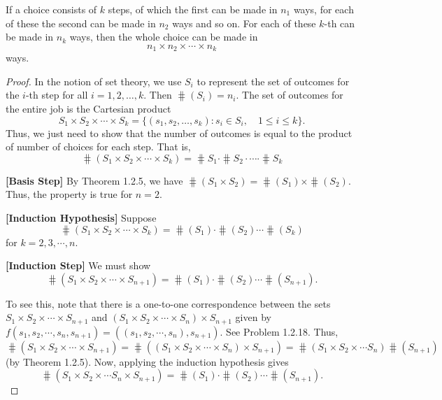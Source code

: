 \begin{theorem}
    If a choice consists of $k$ steps, of which the first can be made in $n_1$ ways, for each of these the second can be made in $n_2$ 
    ways and so on. For each of these $k$-th can be made in $n_k$ ways, then the whole choice can be made in 
    \[
        n_1 \times n_2 \times \cdots \times n_k
    \]
    ways.
\end{theorem}
\begin{proof}
    In the notion of set theory, we use $S_i$ to represent the set of outcomes for the $i$-th step for all $i = 1, 2, \ldots, k$. 
    Then $\hash (S_i) = n_i$. The set of outcomes for the entire job is the Cartesian product 
    \begin{equation}
        S_1 \times S_2 \times \cdots \times S_k = \{ (s_1, s_2, \ldots, s_k) : s_i \in S_i, \quad 1 \leq i \leq k \}.
    \end{equation}
    Thus, we just need to show that the number of outcomes is equal to the product of number of choices for each step. That is,
    \begin{equation}
        \hash (S_1 \times S_2 \times \cdots \times S_k) = \hash S_1 \cdot \hash S_2 \cdot \cdots \cdot \hash S_k
    \end{equation}

    \textbf{[Basis Step]} By Theorem 1.2.5, we have $\hash(S_1 \times S_2) = \hash(S_1) \times \hash(S_2)$. Thus, the property
    is true for $n = 2$.

    \vspace*{0.5em}
    \textbf{[Induction Hypothesis]}
    Suppose
    \[
        \hash(S_1 \times S_2 \times \cdots \times S_k) = \hash(S_1) \cdot \hash(S_2) \cdots \hash(S_k)
    \]
    for $k = 2, 3, \cdots, n$.

    \vspace*{0.5em}
    \textbf{[Induction Step]}
    We must show
    \[
        \hash(S_1 \times S_2 \times \cdots \times S_{n+1}) = \hash(S_1) \cdot \hash(S_2) \cdots \hash(S_{n+1}).
    \]

    To see this, note that there is a one-to-one correspondence between the sets
    $S_1 \times S_2 \times \cdots \times S_{n+1}$ and $(S_1 \times S_2 \times \cdots \times S_n) \times S_{n+1}$ given by $f(s_1, s_2, \cdots, s_n, s_{n+1}) =
    ((s_1, s_2, \cdots, s_n), s_{n+1})$. See Problem 1.2.18. Thus, \[\hash(S_1 \times S_2 \times \cdots \times S_{n+1}) =
    \hash((S_1 \times S_2 \times \cdots \times S_n) \times S_{n+1}) = \hash(S_1 \times S_2 \times \cdots S_n)\hash(S_{n+1})\] (by Theorem 1.2.5).
    Now, applying the induction hypothesis gives
    \[
        \hash(S_1 \times S_2 \times \cdots S_n \times S_{n+1}) = \hash(S_1) \cdot \hash(S_2) \cdots \hash(S_{n+1}).
    \]
\end{proof}

